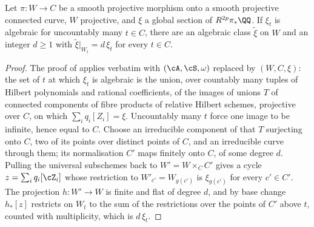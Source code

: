 \begin{lemma}\label{lem:spreading}
Let $\pi\colon W\to C$ be a smooth projective morphism onto a smooth projective
connected curve, $W$ projective, and $\xi$ a global section of
$R^{2p}\pi_{*}\QQ$. If $\xi_{t}$ is algebraic for uncountably many $t\in C$,
there are an algebraic class $\tilde\xi$ on $W$ and an integer $d\ge1$ with
$\tilde\xi|_{W_{t}}=d\,\xi_{t}$ for every $t\in C$.
\end{lemma}

\begin{proof}
The proof of \cite[Theorem~16.4]{paperI} applies verbatim with $(\cA,\cS,\omega)$
replaced by $(W,C,\xi)$: the set of $t$ at which $\xi_{t}$ is algebraic is
the union, over countably many tuples of Hilbert polynomials and rational
coefficients, of the images of unions $T$ of connected components of fibre
products of relative Hilbert schemes, projective over $C$, on which
$\sum_{i}q_{i}[Z_{i}]=\xi$. Uncountably many $t$ force one image to be
infinite, hence equal to $C$. Choose an irreducible component of that $T$
surjecting onto $C$, two of its points over distinct points of $C$, and an
irreducible curve through them; its normalisation $C'$ maps finitely onto $C$,
of some degree $d$. Pulling the universal subschemes back to
$W'=W\times_{C}C'$ gives a cycle $z=\sum_{i}q_{i}[\cZ_{i}]$ whose restriction
to $W'_{c'}=W_{g(c')}$ is $\xi_{g(c')}$ for every $c'\in C'$. The projection
$h\colon W'\to W$ is finite and flat of degree $d$, and by base change
$h_{*}[z]$ restricts on $W_{t}$ to the sum of the restrictions over the
points of $C'$ above $t$, counted with multiplicity, which is $d\,\xi_{t}$.
\end{proof}

